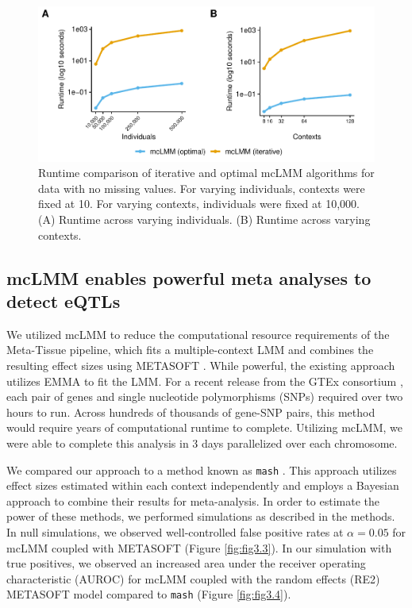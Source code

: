         \begin{figure}
            \centering
            \includegraphics[width=\textwidth]{chapter3/figures/Figure_2.pdf}
            \caption{Runtime comparison of iterative and optimal mcLMM algorithms for data with no missing values. For varying individuals, contexts were fixed at 10. For varying contexts, individuals were fixed at 10,000. (A) Runtime across varying individuals. (B) Runtime across varying contexts.}
            \label{fig:fig3.2}
        \end{figure}
    
    \subsection{mcLMM enables powerful meta analyses to detect eQTLs}
        We utilized mcLMM to reduce the computational resource requirements of the Meta-Tissue pipeline, which fits a multiple-context LMM and combines the resulting effect sizes using METASOFT \cite{Sul}. While powerful, the existing approach utilizes EMMA to fit the LMM. For a recent release from the GTEx consortium  \cite{GTEx_Consortium2020-xx}, each pair of genes and single nucleotide polymorphisms (SNPs) required over two hours to run. Across hundreds of thousands of gene-SNP pairs, this method would require years of computational runtime to complete. Utilizing mcLMM, we were able to complete this analysis in 3 days parallelized over each chromosome. 
        
        We compared our approach to a method known as \texttt{mash} \cite{Urbut2019}. This approach utilizes effect sizes estimated within each context independently and employs a Bayesian approach to combine their results for meta-analysis. In order to estimate the power of these methods, we performed simulations as described in the methods. In null simulations, we observed well-controlled false positive rates at $\alpha = 0.05$ for mcLMM coupled with METASOFT (Figure \ref{fig:fig3.3}). In our simulation with true positives, we observed an increased area under the receiver operating characteristic (AUROC) for mcLMM coupled with the random effects (RE2) METASOFT model compared to \texttt{mash} (Figure \ref{fig:fig3.4}).
        
